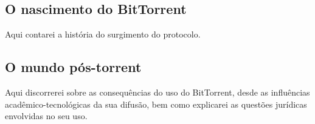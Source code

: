 \subsection{O nascimento do BitTorrent}

Aqui contarei a história do surgimento do protocolo.

\subsection{O mundo pós-torrent}

Aqui discorrerei sobre as consequências do uso do BitTorrent, desde as influências acadêmico-tecnológicas da sua difusão, bem como explicarei as questões jurídicas envolvidas no seu uso.

\clearpage